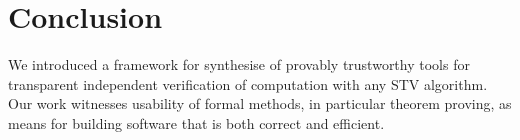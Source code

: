 \documentclass[10pt,conference]{IEEEtran}
\begin{document}
\section{Conclusion}
We introduced a framework for synthesise of provably trustworthy tools for transparent independent verification of computation with any STV algorithm.  
Our work witnesses usability of formal methods, in particular theorem proving, as means for building software that is both correct and efficient. 
\end{document}
